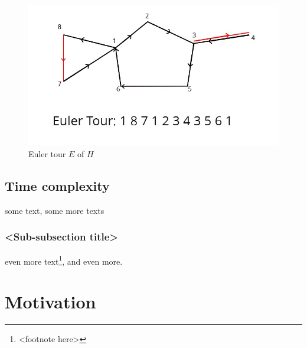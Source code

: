 \begin{figure}[h]
    \centering
    \caption{Euler tour $E$ of $H$}
    \includegraphics[scale=0.4]{3.jpg}
\end{figure}
\subsection{Time complexity}

some text\cite{citation-1-name-here}, some more texts

\subsubsection{<Sub-subsection title>}
even more text\footnote{<footnote here>}, and even more.

\section{Motivation}
